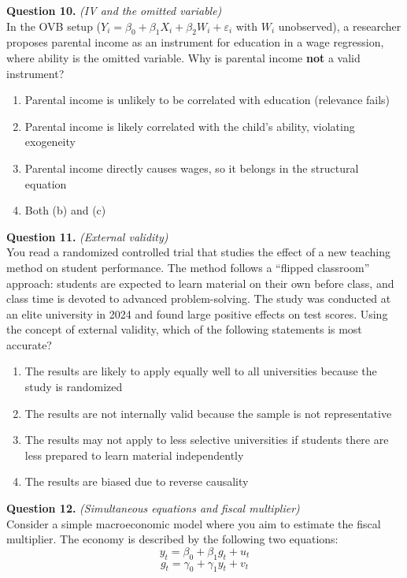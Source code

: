 \documentclass[11pt]{article}
\newcommand{\choices}[4]{%
  \begin{enumerate}[label=(\alph*), leftmargin=2em, itemsep=2pt]
    \item #1
    \item #2
    \item #3
    \item #4
  \end{enumerate}
}
\begin{document}
\bigskip


\noindent\textbf{Question 10.} \textit{(IV and the omitted variable)} \\[0.3em]
In the OVB setup ($Y_i = \beta_0 + \beta_1 X_i + \beta_2 W_i + \varepsilon_i$ with $W_i$ unobserved), a researcher proposes parental income as an instrument for education in a wage regression, where ability is the omitted variable. Why is parental income \textbf{not} a valid instrument?

\choices
{Parental income is unlikely to be correlated with education (relevance fails)}
{Parental income is likely correlated with the child's ability, violating exogeneity}
{Parental income directly causes wages, so it belongs in the structural equation}
{Both (b) and (c)}

\bigskip


\noindent\textbf{Question 11.} \textit{(External validity)} \\[0.3em]
You read a randomized controlled trial that studies the effect of a new teaching method on student performance. The method follows a ``flipped classroom'' approach: students are expected to learn material on their own before class, and class time is devoted to advanced problem-solving. The study was conducted at an elite university in 2024 and found large positive effects on test scores.
Using the concept of external validity, which of the following statements is most accurate?

\choices
{The results are likely to apply equally well to all universities because the study is randomized}
{The results are not internally valid because the sample is not representative}
{The results may not apply to less selective universities if students there are less prepared to learn material independently}
{The results are biased due to reverse causality}

\bigskip


\noindent\textbf{Question 12.} \textit{(Simultaneous equations and fiscal multiplier)} \\[0.3em]
Consider a simple macroeconomic model where you aim to estimate the fiscal multiplier. The economy is described by the following two equations:
\begin{equation}
    y_t = \beta_0 + \beta_1 g_t + u_t
\end{equation}
\begin{equation}
    g_t = \gamma_0 + \gamma_1 y_t + v_t
\end{equation}
\end{document}
